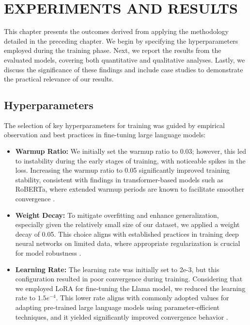 \captionsetup[lstlisting]{font=small,labelfont=bf}



\chapter{ EXPERIMENTS AND RESULTS}

This chapter presents the outcomes derived from applying the methodology detailed in the preceding chapter. We begin by specifying the hyperparameters employed during the training phase. Next, we report the results from the evaluated models, covering both quantitative and qualitative analyses. Lastly, we discuss the significance of these findings and include case studies to demonstrate the practical relevance of our results.

\section{Hyperparameters}


The selection of key hyperparameters for training was guided by empirical observation and best practices in fine-tuning large language models:

\begin{itemize}
  \item \textbf{Warmup Ratio:} We initially set the warmup ratio to 0.03; however, this led to instability during the early stages of training, with noticeable spikes in the loss. Increasing the warmup ratio to 0.05 significantly improved training stability, consistent with findings in transformer-based models such as RoBERTa, where extended warmup periods are known to facilitate smoother convergence \citep{liu2019robertarobustlyoptimizedbert}.
  \item \textbf{Weight Decay:} To mitigate overfitting and enhance generalization, especially given the relatively small size of our dataset, we applied a weight decay of 0.05. This choice aligns with established practices in training deep neural networks on limited data, where appropriate regularization is crucial for model robustness \citep{brainacgan}.
  \item \textbf{Learning Rate:} The learning rate was initially set to 2e-3, but this configuration resulted in poor convergence during training. Considering that we employed LoRA for fine-tuning the Llama model, we reduced the learning rate to $1.5e^{-4}$. This lower rate aligns with commonly adopted values for adapting pre-trained large language models using parameter-efficient techniques, and it yielded significantly improved convergence behavior \citep{zhou2024automixqselfadjustingquantizationhigh}.
\end{itemize}

